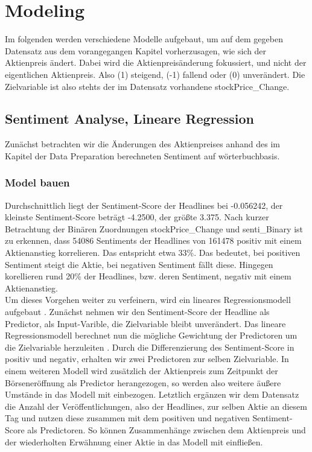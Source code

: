 \chapter{Modeling}
Im folgenden werden verschiedene Modelle aufgebaut, um auf dem gegeben Datensatz aus dem vorangegangen Kapitel vorherzusagen, wie sich der Aktienpreis ändert. Dabei wird die Aktienpreisänderung fokussiert, und nicht der eigentlichen Aktienpreis. Also (1) steigend, (-1) fallend oder (0) unverändert. Die Zielvariable ist also stehts der im Datensatz vorhandene stockPrice\_Change.
\section{Sentiment Analyse, Lineare Regression}
Zunächst betrachten wir die Änderungen des Aktienpreises anhand des im Kapitel der Data Preparation berechneten Sentiment auf wörterbuchbasis.

\subsection{Model bauen}
Durchschnittlich liegt der Sentiment-Score der Headlines bei -0.056242, der kleinste Sentiment-Score beträgt -4.2500, der größte 3.375.	
Nach kurzer Betrachtung der Binären Zuordnungen stockPrice\_Change und senti\_Binary ist zu erkennen, dass 54086 Sentiments der Headlines von 161478 positiv mit einem Aktienanstieg korrelieren. Das entspricht etwa 33\%. Das bedeutet, bei positiven Sentiment steigt die Aktie, bei negativen Sentiment fällt diese. Hingegen korellieren rund 20\% der Headlines, bzw. deren Sentiment, negativ mit einem Aktienanstieg.\\
Um dieses Vorgehen weiter zu verfeinern, wird ein lineares Regressionsmodell aufgebaut \citep{linearRegression}. Zunächst nehmen wir den Sentiment-Score der Headline als Predictor, als Input-Varible, die Zielvariable bleibt unverändert. Das lineare Regressionsmodell berechnet nun die mögliche Gewichtung der Predictoren um die Zielvariable herzuleiten \citep{cakra_trisedya2016}. Durch die Differenzierung des Sentiment-Score in positiv und negativ, erhalten wir zwei Predictoren zur selben Zielvariable. 
In einem weiteren Modell wird zusätzlich der Aktienpreis zum Zeitpunkt der Börseneröffnung als Predictor herangezogen, so werden also weitere äußere Umstände in das Modell mit einbezogen. Letztlich ergänzen wir dem Datensatz die Anzahl der Veröffentlichungen, also der Headlines, zur selben Aktie an diesem Tag und nutzen diese zusammen mit dem positiven und negativen Sentiment-Score als Predictoren. So können Zusammenhänge zwischen dem Aktienpreis und der wiederholten Erwähnung einer Aktie in das Modell mit einfließen.

